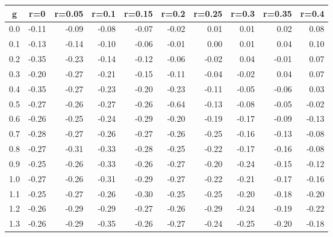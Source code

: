 %
\begin{table}[!tbp]
 \begin{center}
 \begin{tabular}{rrrrrrrrrr}\hline\hline
\multicolumn{1}{c}{g}&\multicolumn{1}{c}{r=0}&\multicolumn{1}{c}{r=0.05}&\multicolumn{1}{c}{r=0.1}&\multicolumn{1}{c}{r=0.15}&\multicolumn{1}{c}{r=0.2}&\multicolumn{1}{c}{r=0.25}&\multicolumn{1}{c}{r=0.3}&\multicolumn{1}{c}{r=0.35}&\multicolumn{1}{c}{r=0.4}\tabularnewline
\hline
0.0&-0.11&-0.09&-0.08&-0.07&-0.02& 0.01& 0.01& 0.02& 0.08\tabularnewline
0.1&-0.13&-0.14&-0.10&-0.06&-0.01& 0.00& 0.01& 0.04& 0.10\tabularnewline
0.2&-0.35&-0.23&-0.14&-0.12&-0.06&-0.02& 0.04&-0.01& 0.07\tabularnewline
0.3&-0.20&-0.27&-0.21&-0.15&-0.11&-0.04&-0.02& 0.04& 0.07\tabularnewline
0.4&-0.35&-0.27&-0.23&-0.20&-0.23&-0.11&-0.05&-0.06& 0.03\tabularnewline
0.5&-0.27&-0.26&-0.27&-0.26&-0.64&-0.13&-0.08&-0.05&-0.02\tabularnewline
0.6&-0.26&-0.25&-0.24&-0.29&-0.20&-0.19&-0.17&-0.09&-0.13\tabularnewline
0.7&-0.28&-0.27&-0.26&-0.27&-0.26&-0.25&-0.16&-0.13&-0.08\tabularnewline
0.8&-0.27&-0.31&-0.33&-0.28&-0.25&-0.22&-0.17&-0.16&-0.08\tabularnewline
0.9&-0.25&-0.26&-0.33&-0.26&-0.27&-0.20&-0.24&-0.15&-0.12\tabularnewline
1.0&-0.27&-0.26&-0.31&-0.29&-0.27&-0.22&-0.21&-0.17&-0.16\tabularnewline
1.1&-0.25&-0.27&-0.26&-0.30&-0.25&-0.25&-0.20&-0.18&-0.20\tabularnewline
1.2&-0.26&-0.29&-0.29&-0.27&-0.26&-0.29&-0.24&-0.19&-0.22\tabularnewline
1.3&-0.26&-0.29&-0.35&-0.26&-0.27&-0.24&-0.25&-0.20&-0.18\tabularnewline
\hline
\end{tabular}

\end{center}

\end{table}

